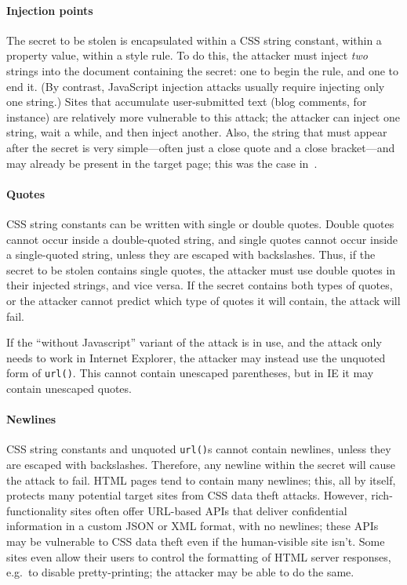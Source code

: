 \documentclass{acm_proc_article-sp}
\begin{document}
\paragraph{Injection points}
The secret to be stolen is encapsulated within a CSS string constant,
within a property value, within a style rule.  To do this, the
attacker must inject \emph{two} strings into the document containing
the secret: one to begin the rule, and one to end it.  (By contrast,
JavaScript injection attacks usually require injecting only one
string.)  Sites that accumulate user-submitted text (blog comments,
for instance) are relatively more vulnerable to this attack; the
attacker can inject one string, wait a while, and then inject another.
Also, the string that must appear after the secret is very
simple---often just a close quote and a close bracket---and may
already be present in the target page; this was the case
in~\cite{cssxss08}.

\paragraph{Quotes}
CSS string constants can be written with single or double quotes.
Double quotes cannot occur inside a double-quoted string, and single
quotes cannot occur inside a single-quoted string, unless they are
escaped with backslashes.  Thus, if the secret to be stolen contains
single quotes, the attacker must use double quotes in their injected
strings, and vice versa.  If the secret contains both types of quotes,
or the attacker cannot predict which type of quotes it will contain,
the attack will fail.

If the “without Javascript” variant of the attack is in use, and the
attack only needs to work in Internet Explorer, the attacker may
instead use the unquoted form of \texttt{url()}.  This cannot contain
unescaped parentheses, but in IE it may contain unescaped quotes.

\paragraph{Newlines}
CSS string constants and unquoted \texttt{url()}s cannot contain
newlines, unless they are escaped with backslashes.  Therefore, any
newline within the secret will cause the attack to fail.  HTML pages
tend to contain many newlines; this, all by itself, protects many
potential target sites from CSS data theft attacks.  However,
rich-functionality sites often offer URL-based APIs that deliver
confidential information in a custom JSON or XML format, with no
newlines; these APIs may be vulnerable to CSS data theft even if the
human-visible site isn't.  Some sites even allow their users to
control the formatting of HTML server responses, e.g.\ to disable
pretty-printing; the attacker may be able to do the same.
\end{document}
